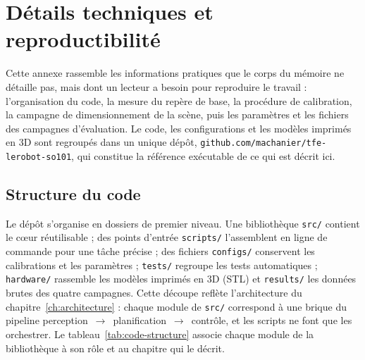\chapter{Détails techniques et reproductibilité}
\label{ann:repro}

Cette annexe rassemble les informations pratiques que le corps du mémoire ne détaille pas, mais dont un lecteur a besoin pour reproduire le travail : l'organisation du code, la mesure du repère de base, la procédure de calibration, la campagne de dimensionnement de la scène, puis les paramètres et les fichiers des campagnes d'évaluation. Le code, les configurations et les modèles imprimés en 3D sont regroupés dans un unique dépôt, \texttt{github.com/machanier/tfe-lerobot-so101}, qui constitue la référence exécutable de ce qui est décrit ici.

\section{Structure du code}
\label{sec:ann-code}

Le dépôt s'organise en dossiers de premier niveau. Une bibliothèque \texttt{src/} contient le cœur réutilisable ; des points d'entrée \texttt{scripts/} l'assemblent en ligne de commande pour une tâche précise ; des fichiers \texttt{configs/} conservent les calibrations et les paramètres ; \texttt{tests/} regroupe les tests automatiques ; \texttt{hardware/} rassemble les modèles imprimés en 3D (STL) et \texttt{results/} les données brutes des quatre campagnes. Cette découpe reflète l'architecture du chapitre~\ref{ch:architecture} : chaque module de \texttt{src/} correspond à une brique du pipeline perception~$\rightarrow$~planification~$\rightarrow$~contrôle, et les scripts ne font que les orchestrer. Le tableau~\ref{tab:code-structure} associe chaque module de la bibliothèque à son rôle et au chapitre qui le décrit.

